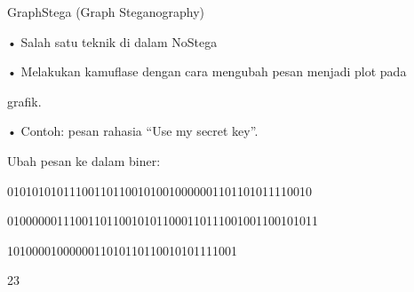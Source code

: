 \documentclass{article}
\begin{document}

GraphStega (Graph Steganography)

• Salah satu teknik di dalam NoStega

• Melakukan kamuflase dengan cara mengubah pesan menjadi plot pada 

grafik.

• Contoh: pesan rahasia “Use my secret key”. 

   Ubah pesan ke dalam biner:

0101010101110011011001010010000001101101011110010

01000000111001101100101011000110111001001100101011

1010000100000011010110110010101111001

23
\end{document}
